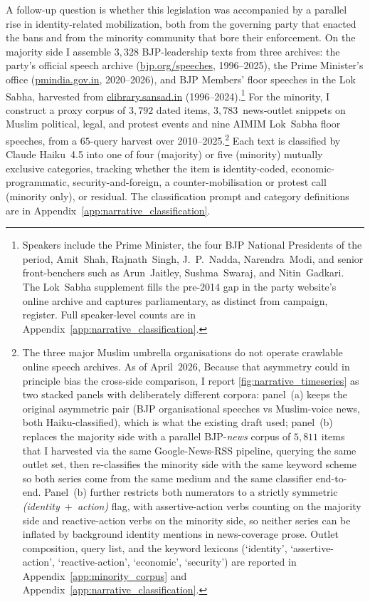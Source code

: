 A follow-up question is whether this legislation was accompanied
by a parallel rise in identity-related mobilization, both
from the governing party that enacted the bans and from the minority
community that bore their enforcement. On the majority side I assemble $3{,}328$ BJP-leadership texts from
three archives: the party's official speech archive
(\href{https://www.bjp.org/speeches}{bjp.org/speeches}, 1996--2025), the
Prime Minister's office
(\href{https://www.pmindia.gov.in}{pmindia.gov.in}, 2020--2026), and BJP
Members' floor speeches in the Lok Sabha, harvested from
\href{https://elibrary.sansad.in}{elibrary.sansad.in}
(1996--2024).\footnote{Speakers include the Prime Minister, the four BJP
National Presidents of the period, Amit~Shah, Rajnath~Singh, J.~P.~Nadda,
Narendra~Modi, and senior front-benchers such as Arun~Jaitley,
Sushma~Swaraj, and Nitin~Gadkari. The Lok~Sabha supplement fills the
pre-2014 gap in the party website's online archive and captures
parliamentary, as distinct from campaign, register. Full speaker-level
counts are in Appendix~\ref{app:narrative_classification}.} For the minority,
I construct a proxy corpus of $3{,}792$ dated
items, $3{,}783$~news-outlet snippets on Muslim political, legal, and
protest events and nine AIMIM Lok~Sabha floor speeches, from a
$65$-query harvest over 2010--2025.\footnote{The three major Muslim umbrella organisations do not operate crawlable
online speech archives. As of April~$2026$,
Because that
asymmetry could in principle bias the cross-side comparison, I report
\autoref{fig:narrative_timeseries} as two stacked panels with deliberately
different corpora: panel~(a) keeps the original asymmetric pair
(BJP organisational speeches vs Muslim-voice news, both Haiku-classified),
which is what the existing draft used; panel~(b) replaces the majority
side with a parallel BJP-\emph{news} corpus of $5{,}811$ items that I
harvested via the same Google-News-RSS pipeline, querying the same outlet
set, then re-classifies the minority side with the same keyword scheme so
both series come from the same medium and the same classifier end-to-end.
Panel~(b) further restricts both numerators to a strictly symmetric
\emph{(identity~$+$~action)} flag, with assertive-action verbs counting
on the majority side and reactive-action verbs on the minority side, so
neither series can be inflated by background identity mentions in
news-coverage prose. Outlet composition, query list, and the
keyword lexicons (`identity', `assertive-action', `reactive-action',
`economic', `security') are reported in
Appendix~\ref{app:minority_corpus} and
Appendix~\ref{app:narrative_classification}.}
Each text is classified by Claude Haiku~4.5 into one of four (majority) or
five (minority) mutually exclusive categories, tracking whether the item is
identity-coded, economic-programmatic, security-and-foreign, a
counter-mobilisation or protest call (minority only), or residual. The
classification prompt and category definitions are in
Appendix~\ref{app:narrative_classification}.

